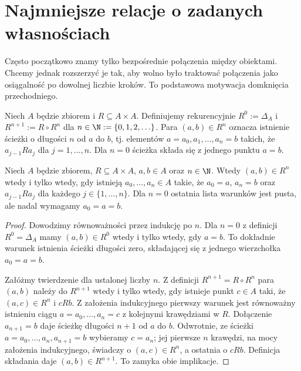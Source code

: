 \section{Najmniejsze relacje o zadanych własnościach}
\label{sec:relation-closures}
Często początkowo znamy tylko bezpośrednie połączenia między
obiektami. Chcemy jednak rozszerzyć je tak, aby wolno było
traktować połączenia jako osiągalność po dowolnej liczbie kroków.
To podstawowa motywacja domknięcia przechodniego.

\begin{definicja}
\label{def:relation-powers}
Niech $A$ będzie zbiorem i $R\subseteq A\times A$.
Definiujemy rekurencyjnie
$R^0:=\Delta_A$ i $R^{n+1}:=R\circ R^n$ dla
$n\in\N:=\{0,1,2,\ldots\}$. Para $(a,b)\in R^n$
oznacza istnienie ścieżki o długości $n$ od $a$ do $b$,
tj. elementów $a=a_0,a_1,\ldots,a_n=b$ takich,
że $a_{j-1}Ra_j$ dla $j=1,\ldots,n$.
Dla $n=0$ ścieżka składa się z jednego punktu $a=b$.
\end{definicja}

\begin{lemat}\label{lem:relation-paths-xlii}
Niech $A$ będzie zbiorem, $R\subseteq A\times A$,
$a,b\in A$ oraz $n\in\N$. Wtedy $(a,b)\in R^n$
wtedy i tylko wtedy, gdy istnieją
$a_0,\ldots,a_n\in A$ takie, że
$a_0=a$, $a_n=b$ oraz $a_{j-1}Ra_j$ dla
każdego $j\in\{1,\ldots,n\}$.
Dla $n=0$ ostatnia lista warunków jest pusta,
ale nadal wymagamy $a_0=a=b$.
\end{lemat}
\begin{proof}
Dowodzimy równoważności przez indukcję po $n$.
Dla $n=0$ z definicji $R^0=\Delta_A$ mamy
$(a,b)\in R^0$ wtedy i tylko wtedy, gdy $a=b$.
To dokładnie warunek istnienia ścieżki długości zero,
składającej się z jednego wierzchołka $a_0=a=b$.

Załóżmy twierdzenie dla ustalonej liczby $n$.
Z definicji $R^{n+1}=R\circ R^n$ para $(a,b)$
należy do $R^{n+1}$ wtedy i tylko wtedy, gdy
istnieje punkt $c\in A$ taki, że $(a,c)\in R^n$
i $cRb$. Z założenia indukcyjnego pierwszy warunek
jest równoważny istnieniu ciągu
$a=a_0,\ldots,a_n=c$ z kolejnymi krawędziami w $R$.
Dołączenie $a_{n+1}=b$ daje ścieżkę długości $n+1$
od $a$ do $b$. Odwrotnie, ze ścieżki
$a=a_0,\ldots,a_n,a_{n+1}=b$ wybieramy $c=a_n$;
jej pierwsze $n$ krawędzi, na mocy założenia
indukcyjnego, świadczy o $(a,c)\in R^n$,
a ostatnia o $cRb$. Definicja składania daje
$(a,b)\in R^{n+1}$. To zamyka obie implikacje.
\end{proof}


